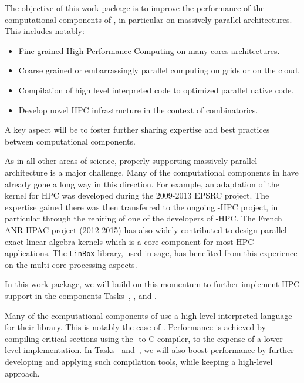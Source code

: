 \begin{workpackage}[id=hpc,wphases=36-48,
  title=High Performance Computing,
  PSRM=1, %
  LLRM=12, %
  SARM=1, %
  UKRM=1, %
  UBRM=1, %
  UJFRM=12] %
  
\begin{wpobjectives}
  The objective of this work package is to improve the performance of
  the computational components of \TheProject, in particular on
  massively parallel architectures. This includes notably:
  \begin{itemize}
  \item Fine grained High Performance Computing on many-cores
    architectures.
  \item Coarse grained or embarrassingly parallel computing on grids
    or on the cloud.
  \item Compilation of high level interpreted code to optimized
    parallel native code.
  \item Develop novel HPC infrastructure in the context of
    combinatorics.
  \end{itemize}
  A key aspect will be to foster further sharing expertise and best
  practices between computational components.
\end{wpobjectives}

\begin{wpdescription}
  As in all other areas of science, properly supporting massively
  parallel architecture is a major challenge. Many of the
  computational components in \TheProject have already gone a long way
  in this direction. For example, an adaptation of the \GAP kernel for
  HPC was developed during the 2009-2013 EPSRC project. The expertise
  gained there was then transferred to the ongoing \Singular-HPC
  project, in particular through the rehiring of one of the developers
  of \GAP-HPC. The French ANR HPAC project (2012-2015) has also widely contributed to design
  parallel exact linear algebra kernels  which is a core component for most HPC
  applications. The \texttt{LinBox} library, used in sage, has benefited from this
  experience on the multi-core processing aspects. 

  In this work package, we will build on this momentum to further
  implement HPC support in the components Tasks~,
  , and .


  Many of the computational components of \TheProject use a high level
  interpreted language for their library. This is notably the case of
  \Sage. Performance is achieved by compiling critical sections using
  the \Cython \Python-to-C compiler, to the expense of a lower level
  implementation. In Tasks~
  and~, we will also boost performance by
  further developing and applying such compilation tools, while
  keeping a high-level approach.


\end{wpdescription}
\end{workpackage}
